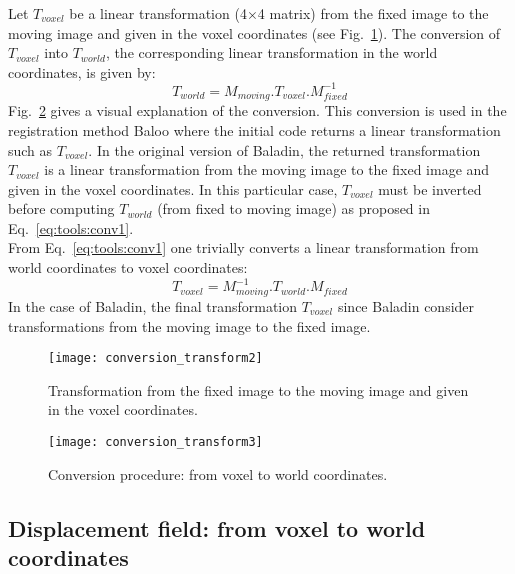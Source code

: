 Let $T_{voxel}$ be a linear transformation (4$\times$4 matrix) from the fixed image to the moving image and given in the voxel coordinates (see Fig.~\ref{fig:tools:conv:2}). The conversion of $T_{voxel}$ into $T_{world}$, the corresponding linear transformation in the world coordinates, is given by:
%
\begin{equation}
T_{world} = M_{moving} . T_{voxel} . M^{-1}_{fixed}
\label{eq:tools:conv1}
\end{equation}
%
Fig.~\ref{fig:tools:conv:3} gives a visual explanation of the conversion. This conversion is used in the registration method Baloo where the initial code returns a linear transformation such as $T_{voxel}$. In the original version of Baladin, the returned transformation $T_{voxel}$ is a linear transformation from the moving image to the fixed image and given in the voxel coordinates. In this particular case, $T_{voxel}$ must be inverted before computing $T_{world}$ (from fixed to moving image) as proposed in Eq.~\ref{eq:tools:conv1}.
\\
From Eq.~\ref{eq:tools:conv1} one trivially converts a linear transformation from world coordinates to voxel coordinates:
%
\begin{equation}
T_{voxel} = M^{-1}_{moving} . T_{world} . M_{fixed}
\label{eq:tools:conv2}
\end{equation}
%
In the case of Baladin, the final transformation $T_{voxel}$ since Baladin consider transformations from the moving image to the fixed image.

\begin{figure}[!htbp]
\centering
\texttt{[image: conversion\_transform2]}
\caption{Transformation from the fixed image to the moving image and given in the voxel coordinates.}
\label{fig:tools:conv:2}
\end{figure}

\begin{figure}[!htbp]
\centering
\texttt{[image: conversion\_transform3]}
\caption{Conversion procedure: from voxel to world coordinates.}
\label{fig:tools:conv:3}
\end{figure}



\subsection{Displacement field: from voxel to world coordinates}

